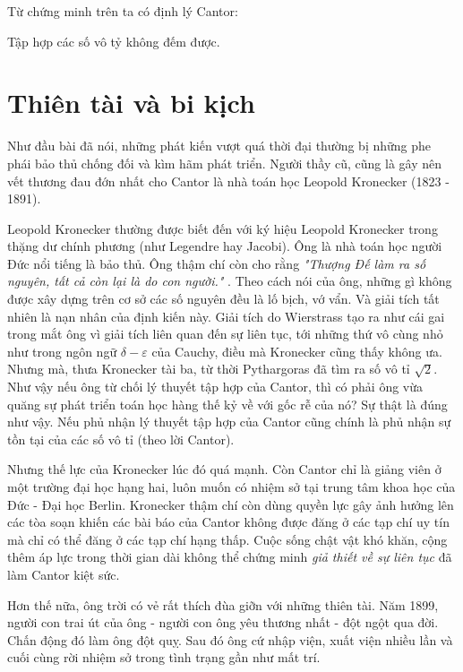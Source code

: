 Từ chứng minh trên ta có định lý Cantor:

\begin{theorem}
    Tập hợp các số vô tỷ không đếm được.
\end{theorem}

\section{Thiên tài và bi kịch}

Như đầu bài đã nói, những phát kiến vượt quá thời đại thường bị những
phe phái bảo thủ chống đối và kìm hãm phát triển. Người thầy cũ, cũng 
là gây nên vết thương đau đớn nhất cho Cantor là nhà toán học 
Leopold Kronecker (1823 - 1891).

Leopold Kronecker thường được biết đến với ký hiệu Leopold Kronecker 
trong thặng dư chính phương (như Legendre hay Jacobi). Ông là nhà toán
học người Đức nổi tiếng là bảo thủ. Ông thậm chí còn cho rằng \textit{
    "Thượng Đế làm ra số nguyên, tất cả còn lại là do con người."
}. Theo cách nói của ông, những gì không được xây dựng trên cơ sở
các số nguyên đều là lố bịch, vớ vẩn. Và giải tích tất nhiên là nạn 
nhân của định kiến này. Giải tích do Wierstrass tạo ra như cái gai trong
mắt ông vì giải tích liên quan đến sự liên tục, tới những thứ vô cùng nhỏ
như trong ngôn ngữ $\delta - \varepsilon$ của Cauchy, điều mà Kronecker 
cũng thấy không ưa. Nhưng mà, thưa Kronecker tài ba, từ thời Pythargoras
đã tìm ra số vô tỉ $\sqrt{2}$. Như vậy nếu ông từ chối lý thuyết tập hợp 
của Cantor, thì có phải ông vừa quăng sự phát triển toán học hàng thế kỷ 
về với gốc rễ của nó? Sự thật là đúng như vậy. Nếu phủ nhận lý thuyết tập
hợp của Cantor cũng chính là phủ nhận sự tồn tại của các số vô tỉ
(theo lời Cantor).

Nhưng thế lực của Kronecker lúc đó quá mạnh. Còn Cantor chỉ là giảng
viên ở một trường đại học hạng hai, luôn muốn có nhiệm sở tại trung 
tâm khoa học của Đức - Đại học Berlin. Kronecker thậm chí còn dùng
quyền lực gây ảnh hưởng lên các tòa soạn khiến các bài báo của Cantor
không được đăng ở các tạp chí uy tín mà chỉ có thể đăng ở các tạp chí 
hạng thấp. Cuộc sống chật vật khó khăn, cộng thêm áp lực trong thời gian
dài không thể chứng minh \textit{giả thiết về sự liên tục} đã làm Cantor
kiệt sức.

Hơn thế nữa, ông trời có vẻ rất thích đùa giỡn với những thiên tài.
Năm 1899, người con trai út của ông - người con ông yêu thương nhất - 
đột ngột qua đời. Chấn động đó làm ông đột quỵ. Sau đó ông cứ nhập viện,
xuất viện nhiều lần và cuối cùng rời nhiệm sở trong tình trạng gần như 
mất trí.

